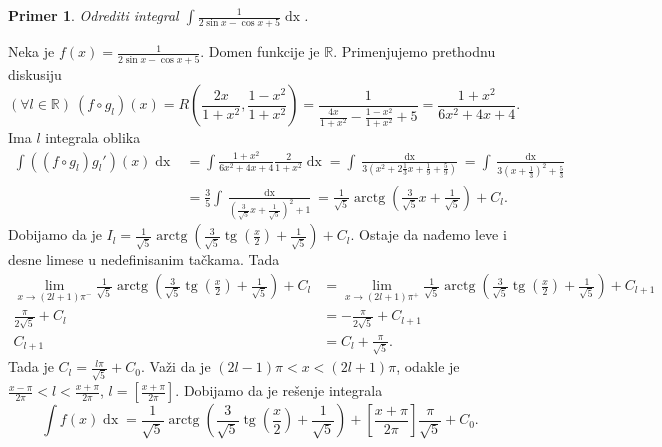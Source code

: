 \documentclass{article}
\newtheorem{prim}{Primer}[section]
\DeclareMathOperator{\tg}{tg}
\DeclareMathOperator{\arctg}{arctg}
\DeclareMathOperator{\dx}{dx}
\begin{document}
\begin{primbox}
    \label{primer_1.15}
    \begin{prim}
        Odrediti integral $\displaystyle\int\frac{1}{2\sin{x}-\cos{x}+5}\dx$.
    \end{prim}
    Neka je $\displaystyle f\left(x\right)=\frac{1}{2\sin{x}-\cos{x}+5}$. Domen funkcije je $\mathbb{R}$. Primenjujemo prethodnu diskusiju
    $$\left(\forall l\in\mathbb{R}\right)\ \left(f\circ g_l\right)\left(x\right)=R\left(\frac{2x}{1+x^2},\frac{1-x^2}{1+x^2}\right)= \frac{1}{\frac{4x}{1+x^2}-\frac{1-x^2}{1+x^2}+5}=\frac{1+x^2}{6x^2+4x+4}.$$
    Ima $l$ integrala oblika
    \begin{align*}
        \int \left(\left(f\circ g_l\right)g_l'\right)\left(x\right)\dx & =\int\frac{1+x^2}{6x^2+4x+4}\frac{2}{1+x^2}\dx=\int \frac{\dx}{3\left(x^2+2\frac{1}{3}x+\frac{1}{9}+\frac{5}{9}\right)}=\int\frac{\dx}{3\left(x+\frac{1}{3}\right)^2+\frac{5}{3}} \\
                                                                       & =\frac{3}{5}\int\frac{\dx}{\left(\frac{3}{\sqrt{5}}x+\frac{1}{\sqrt{5}}\right)^2+1}=\frac{1}{\sqrt{5}}\arctg\left(\frac{3}{\sqrt{5}}x+\frac{1}{\sqrt{5}}\right)+C_l.
    \end{align*}
    Dobijamo da je $I_l =\frac{1}{\sqrt{5}}\arctg\left(\frac{3}{\sqrt{5}}\tg\left(\frac{x}{2}\right)+\frac{1}{\sqrt{5}}\right)+C_l$. Ostaje da nađemo leve i desne limese u nedefinisanim tačkama. Tada
    \begin{align*}
        \lim\limits_{x\to \left(2l+1\right)\pi^{-}}\frac{1}{\sqrt{5}}\arctg\left(\frac{3}{\sqrt{5}}\tg\left(\frac{x}{2}\right)+\frac{1}{\sqrt{5}}\right)+C_l & =\lim\limits_{x\to \left(2l+1\right)\pi^{+}}\frac{1}{\sqrt{5}}\arctg\left(\frac{3}{\sqrt{5}}\tg\left(\frac{x}{2}\right)+\frac{1}{\sqrt{5}}\right)+C_{l+1} \\
        \frac{\pi}{2\sqrt{5}}+C_l                                                                                                                            & =-\frac{\pi}{2\sqrt{5}}+C_{l+1}                                                                                                                           \\
        C_{l+1}                                                                                                                                              & =C_l+\frac{\pi}{\sqrt{5}}.
    \end{align*}
    Tada je $\displaystyle C_l=\frac{l\pi}{\sqrt{5}}+C_0$. Važi da je $\left(2l-1\right)\pi<x<\left(2l+1\right)\pi$, odakle je
    $\displaystyle\frac{x-\pi}{2\pi}<l<\frac{x+\pi}{2\pi}$, $\displaystyle l=\left[\frac{x+\pi}{2\pi}\right]$.
    Dobijamo da je rešenje integrala
    $$\int f\left(x\right)\dx=\frac{1}{\sqrt{5}}\arctg\left(\frac{3}{\sqrt{5}}\tg\left(\frac{x}{2}\right)+\frac{1}{\sqrt{5}}\right)+\left[\frac{x+\pi}{2\pi}\right]\frac{\pi}{\sqrt{5}}+C_0.$$
\end{primbox}
\end{document}
